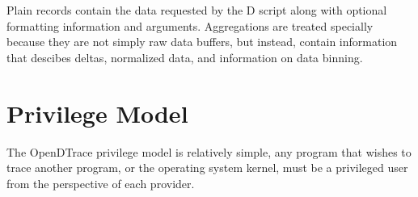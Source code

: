 Plain records contain the data requested by the D script along with
optional formatting information and arguments.  Aggregations are
treated specially because they are not simply raw data buffers, but
instead, contain information that descibes deltas, normalized data,
and information on data binning.

\section{Privilege Model}
\label{sec:privilege}


The OpenDTrace privilege model is relatively simple, any program that
wishes to trace another program, or the operating system kernel, must
be a privileged user from the perspective of each provider.

